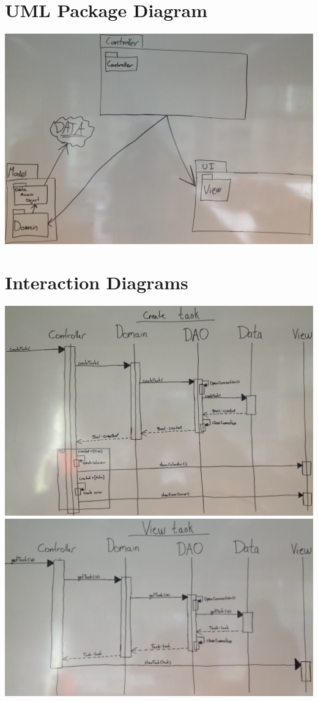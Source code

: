 \documentclass[a4paper, 10pt]{article}
\begin{document}
\section{UML Package Diagram}
\includegraphics[width=\linewidth]{../Pictures/UML_Package_Diagram.jpg}

\section{Interaction Diagrams}
\includegraphics[width=\linewidth]{../Pictures/Interaction_Diagram_Create_Task.jpg}
\includegraphics[width=\linewidth]{../Pictures/Interaction_Diagram_View_Task.jpg}
\end{document}
